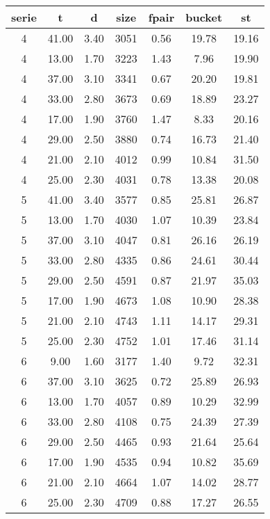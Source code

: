 \begin{tabular}{|c|c|c|c|c|c|c|}
\hline
\textbf{serie} & \textbf{t} & \textbf{d} & \textbf{size} & \textbf{fpair} & \textbf{bucket} & \textbf{st}\\
\hline
4 & 41.00 & 3.40 & 3051 & 0.56 & 19.78 & 19.16\\
\hline
4 & 13.00 & 1.70 & 3223 & 1.43 & 7.96 & 19.90\\
\hline
4 & 37.00 & 3.10 & 3341 & 0.67 & 20.20 & 19.81\\
\hline
4 & 33.00 & 2.80 & 3673 & 0.69 & 18.89 & 23.27\\
\hline
4 & 17.00 & 1.90 & 3760 & 1.47 & 8.33 & 20.16\\
\hline
4 & 29.00 & 2.50 & 3880 & 0.74 & 16.73 & 21.40\\
\hline
4 & 21.00 & 2.10 & 4012 & 0.99 & 10.84 & 31.50\\
\hline
4 & 25.00 & 2.30 & 4031 & 0.78 & 13.38 & 20.08\\
\hline
5 & 41.00 & 3.40 & 3577 & 0.85 & 25.81 & 26.87\\
\hline
5 & 13.00 & 1.70 & 4030 & 1.07 & 10.39 & 23.84\\
\hline
5 & 37.00 & 3.10 & 4047 & 0.81 & 26.16 & 26.19\\
\hline
5 & 33.00 & 2.80 & 4335 & 0.86 & 24.61 & 30.44\\
\hline
5 & 29.00 & 2.50 & 4591 & 0.87 & 21.97 & 35.03\\
\hline
5 & 17.00 & 1.90 & 4673 & 1.08 & 10.90 & 28.38\\
\hline
5 & 21.00 & 2.10 & 4743 & 1.11 & 14.17 & 29.31\\
\hline
5 & 25.00 & 2.30 & 4752 & 1.01 & 17.46 & 31.14\\
\hline
6 & 9.00 & 1.60 & 3177 & 1.40 & 9.72 & 32.31\\
\hline
6 & 37.00 & 3.10 & 3625 & 0.72 & 25.89 & 26.93\\
\hline
6 & 13.00 & 1.70 & 4057 & 0.89 & 10.29 & 32.99\\
\hline
6 & 33.00 & 2.80 & 4108 & 0.75 & 24.39 & 27.39\\
\hline
6 & 29.00 & 2.50 & 4465 & 0.93 & 21.64 & 25.64\\
\hline
6 & 17.00 & 1.90 & 4535 & 0.94 & 10.82 & 35.69\\
\hline
6 & 21.00 & 2.10 & 4664 & 1.07 & 14.02 & 28.77\\
\hline
6 & 25.00 & 2.30 & 4709 & 0.88 & 17.27 & 26.55\\
\hline
\end{tabular}
